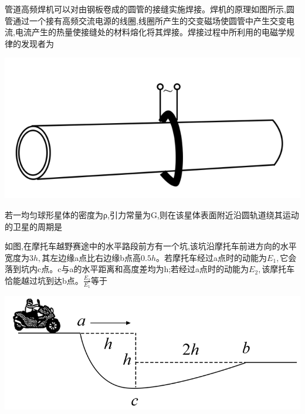 \question[6]管道高频焊机可以对由钢板卷成的圆管的接缝实施焊接。焊机的原理如图所示,圆管通过一个接有高频交流电源的线圈,线圈所产生的交变磁场使圆管中产生交变电流,电流产生的热量使接缝处的材料熔化将其焊接。焊接过程中所利用的电磁学规律的发现者为
\begin{center}
\includegraphics[]{img/image1.png}
\end{center}

\begin{solution}{4cm}

\end{solution}



\question[6]若一均匀球形星体的密度为ρ,引力常量为G,则在该星体表面附近沿圆轨道绕其运动的卫星的周期是
\begin{solution}{4cm}

\end{solution}



\question[6]如图,在摩托车越野赛途中的水平路段前方有一个坑,该坑沿摩托车前进方向的水平宽度为$3h,$其左边缘a点比右边缘b点高$0.5h$。若摩托车经过a点时的动能为$E_1,$它会落到坑内c点。c与a的水平距离和高度差均为h;若经过a点时的动能为$E_2,$该摩托车恰能越过坑到达b点。$\frac{E_{2}}{E_{1}}$等于
\begin{center}
\includegraphics[]{img/image2.png}
\end{center}

